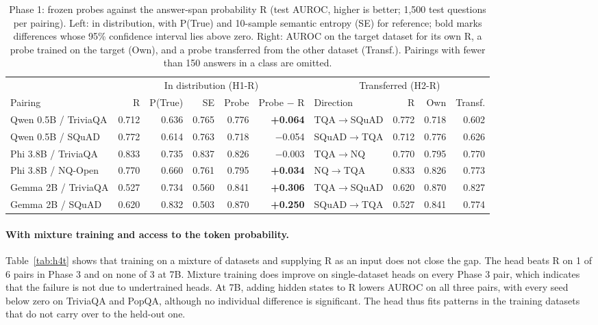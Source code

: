 \documentclass[10pt]{article}
\begin{document}
\begin{table}[t]
\centering
\small
\setlength{\tabcolsep}{4.5pt}
\begin{tabular}{@{}lrrrrr@{\hspace{12pt}}lrrr@{}}
\toprule
 & \multicolumn{5}{c}{In distribution (H1-R)} & \multicolumn{4}{c}{Transferred (H2-R)} \\
\cmidrule(lr){2-6}\cmidrule(l){7-10}
Pairing & R & P(True) & SE & Probe & Probe $-$ R & Direction & R & Own & Transf. \\
\midrule
Qwen 0.5B / TriviaQA & 0.712 & 0.636 & 0.765 & 0.776 & \textbf{+0.064} & TQA$\to$SQuAD & 0.772 & 0.718 & 0.602 \\
Qwen 0.5B / SQuAD & 0.772 & 0.614 & 0.763 & 0.718 & $-$0.054 & SQuAD$\to$TQA & 0.712 & 0.776 & 0.626 \\
Phi 3.8B / TriviaQA & 0.833 & 0.735 & 0.837 & 0.826 & $-$0.003 & TQA$\to$NQ & 0.770 & 0.795 & 0.770 \\
Phi 3.8B / NQ-Open & 0.770 & 0.660 & 0.761 & 0.795 & \textbf{+0.034} & NQ$\to$TQA & 0.833 & 0.826 & 0.773 \\
Gemma 2B / TriviaQA & 0.527 & 0.734 & 0.560 & 0.841 & \textbf{+0.306} & TQA$\to$SQuAD & 0.620 & 0.870 & 0.827 \\
Gemma 2B / SQuAD & 0.620 & 0.832 & 0.503 & 0.870 & \textbf{+0.250} & SQuAD$\to$TQA & 0.527 & 0.841 & 0.774 \\
\bottomrule
\end{tabular}
\caption{Phase 1: frozen probes against the answer-span probability R (test AUROC, higher is better; 1,500 test questions per pairing). Left: in distribution, with P(True) and 10-sample semantic entropy (SE) for reference; bold marks differences whose 95\% confidence interval lies above zero. Right: AUROC on the target dataset for its own R, a probe trained on the target (Own), and a probe transferred from the other dataset (Transf.). Pairings with fewer than 150 answers in a class are omitted.}
\label{tab:phase1}
\end{table}

\paragraph{With mixture training and access to the token probability.} Table~\ref{tab:h4t} shows that training on a mixture of datasets and supplying R as an input does not close the gap. The head beats R on 1 of 6 pairs in Phase 3 and on none of 3 at 7B. Mixture training does improve on single-dataset heads on every Phase 3 pair, which indicates that the failure is not due to undertrained heads. At 7B, adding hidden states to R lowers AUROC on all three pairs, with every seed below zero on TriviaQA and PopQA, although no individual difference is significant. The head thus fits patterns in the training datasets that do not carry over to the held-out one.
\end{document}
